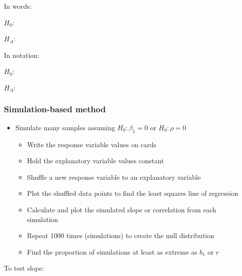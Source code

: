 \documentclass[
]{report}
\begin{document}
In words:

\(H_0:\)

\vspace{0.5in}

\(H_A:\)

\vspace{0.5in}

In notation:

\(H_0:\)

\vspace{0.2in}

\(H_A:\)

\vspace{0.2in}

\hypertarget{simulation-based-method-7}{%
\subsubsection*{Simulation-based method}\label{simulation-based-method-7}}

\begin{itemize}
\item
  Simulate many samples assuming \(H_0: \beta_1 = 0\) or \(H_0: \rho =0\)

  \begin{itemize}
  \item
    Write the response variable values on cards
  \item
    Hold the explanatory variable values constant
  \item
    Shuffle a new response variable to an explanatory variable
  \item
    Plot the shuffled data points to find the least squares line of regression
  \item
    Calculate and plot the simulated slope or correlation from each simulation
  \item
    Repeat 1000 times (simulations) to create the null distribution
  \item
    Find the proportion of simulations at least as extreme as \(b_1\) or \(r\)
  \end{itemize}
\end{itemize}

To test slope:
\end{document}
